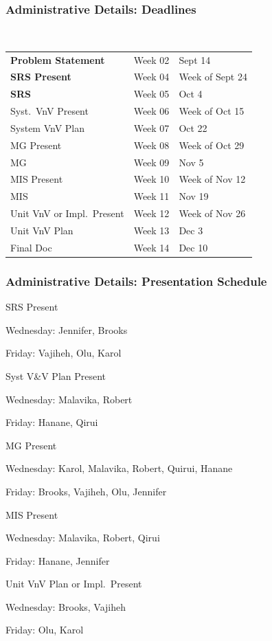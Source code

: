 \documentclass[t,12pt,numbers,fleqn]{beamer}
\begin{document}

\begin{frame}
\frametitle{Administrative Details: Deadlines}

~\newline
\begin{tabular}{l l l}
\textbf{Problem Statement} & Week 02 & Sept 14\\
\textbf{SRS Present} & Week 04 & Week of Sept 24\\
\textbf{SRS} & Week 05 & Oct 4\\
Syst.\ VnV Present & Week 06 & Week of Oct 15\\
System VnV Plan & Week 07 & Oct 22\\
MG Present & Week 08 & Week of Oct 29\\
MG & Week 09 & Nov 5\\
MIS Present & Week 10 & Week of Nov 12\\
MIS & Week 11 & Nov 19\\
Unit VnV or Impl.\ Present & Week 12 & Week of Nov 26\\
Unit VnV Plan & Week 13 & Dec 3\\
Final Doc & Week 14 & Dec 10\\
\end {tabular}

\end{frame}


\begin{frame}
\frametitle{Administrative Details: Presentation Schedule}

\bi
\item SRS Present
\bi
\item Wednesday: Jennifer, Brooks
\item Friday: Vajiheh, Olu, Karol
\ei
\item Syst V\&V Plan Present
\bi
\item Wednesday: Malavika, Robert
\item Friday: Hanane, Qirui
\ei
\item MG Present
\bi
\item Wednesday: Karol, Malavika, Robert, Quirui, Hanane
\item Friday: Brooks, Vajiheh, Olu, Jennifer
\ei
\item MIS Present
\bi
\item Wednesday: Malavika, Robert, Qirui
\item Friday: Hanane,  Jennifer
\ei
\item Unit VnV Plan or Impl.\ Present
\bi
\item Wednesday: Brooks, Vajiheh
\item Friday: Olu, Karol
\ei

\ei

\end{frame}
\end{document}
